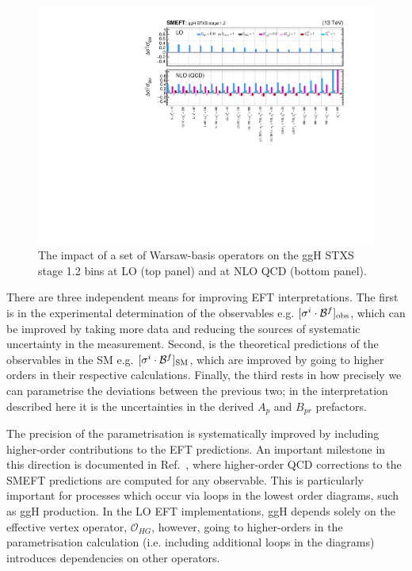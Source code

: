 \begin{figure}
  \centering
  \includegraphics[width=1\textwidth]{Figures/eft/smeft/SMEFTatNLO.pdf}
  \caption[SMEFT at NLO QCD for ggH]
  {
    The impact of a set of Warsaw-basis operators on the ggH STXS stage 1.2 bins at LO (top panel) and at NLO QCD (bottom panel).
  }
  \label{fig:smeftatnlo}
\end{figure}

There are three independent means for improving EFT interpretations. The first is in the experimental determination of the observables e.g. $[\sigma^i\cdot\mathcal{B}^f]_{\rm{obs}}$, which can be improved by taking more data and reducing the sources of systematic uncertainty in the measurement. Second, is the theoretical predictions of the observables in the SM e.g. $[\sigma^i\cdot\mathcal{B}^f]_{\rm{SM}}$, which are improved by going to higher orders in their respective calculations. Finally, the third rests in how precisely we can parametrise the deviations between the previous two; in the interpretation described here it is the uncertainties in the derived $A_p$ and $B_{pr}$ prefactors.

The precision of the parametrisation is systematically improved by including higher-order contributions to the EFT predictions. An important milestone in this direction is documented in Ref.~\cite{Degrande:2020evl}, where higher-order QCD corrections to the SMEFT predictions are computed for any observable. This is particularly important for processes which occur via loops in the lowest order diagrams, such as ggH production. In the LO EFT implementations, ggH depends solely on the effective vertex operator, $\mathcal{O}_{HG}$, however, going to higher-orders in the parametrisation calculation (i.e. including additional loops in the diagrams) introduces dependencies on other operators.

